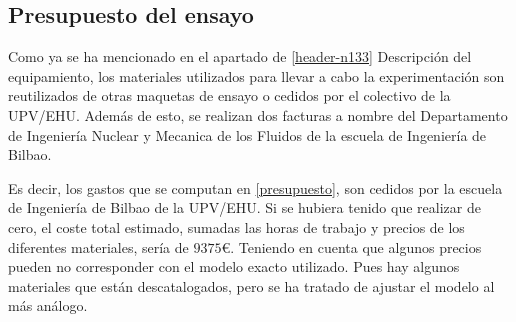 \subsection{Presupuesto del ensayo}\label{header-n0}

Como ya se ha mencionado en el apartado de \autoref{header-n133} Descripción del equipamiento, los materiales utilizados para llevar a cabo la
experimentación son reutilizados de otras maquetas de ensayo o cedidos
por el colectivo de la UPV/EHU. Además de esto, se realizan dos facturas
a nombre del Departamento de Ingeniería Nuclear y Mecanica de los
Fluidos de la escuela de Ingeniería de Bilbao.

Es decir, los gastos que se computan en \autoref{presupuesto}, son cedidos
por la escuela de Ingeniería de Bilbao de la UPV/EHU.
Si se hubiera tenido que realizar de cero, el coste total estimado,
sumadas las horas de trabajo y precios de los diferentes materiales,
sería de $9375\euro{}$. Teniendo en cuenta que algunos precios pueden no
corresponder con el modelo exacto utilizado. Pues hay algunos materiales
que están descatalogados, pero se ha tratado de ajustar el modelo al más
análogo.

